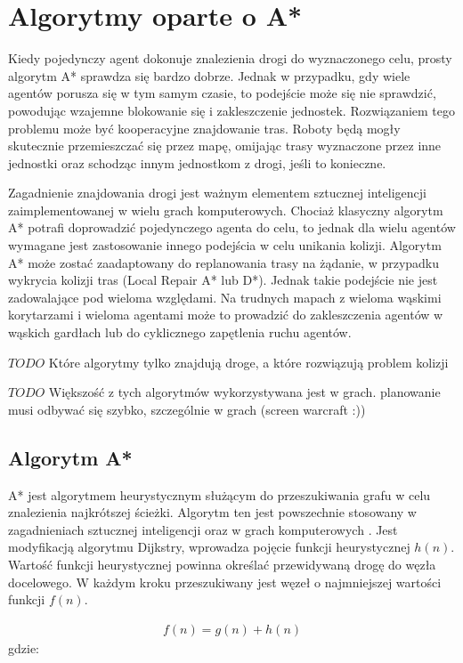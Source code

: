 \chapter{Algorytmy oparte o A*}
\label{ch:astar}

Kiedy pojedynczy agent dokonuje znalezienia drogi do wyznaczonego celu, prosty algorytm A* sprawdza się bardzo dobrze. Jednak w przypadku, gdy wiele agentów porusza się w tym samym czasie, to podejście może się nie sprawdzić, powodując wzajemne blokowanie się i zakleszczenie jednostek. Rozwiązaniem tego problemu może być kooperacyjne znajdowanie tras. Roboty będą mogły skutecznie przemieszczać się przez mapę, omijając trasy wyznaczone przez inne jednostki oraz schodząc innym jednostkom z drogi, jeśli to konieczne. \cite{cooppath}

Zagadnienie znajdowania drogi jest ważnym elementem sztucznej inteligencji zaimplementowanej w wielu grach komputerowych. Chociaż klasyczny algorytm A* potrafi doprowadzić pojedynczego agenta do celu, to jednak dla wielu agentów wymagane jest zastosowanie innego podejścia w celu unikania kolizji. Algorytm A* może zostać zaadaptowany do replanowania trasy na żądanie, w przypadku wykrycia kolizji tras (Local Repair A* lub D*). Jednak takie podejście nie jest zadowalające pod wieloma względami. Na trudnych mapach z wieloma wąskimi korytarzami i wieloma agentami może to prowadzić do zakleszczenia agentów w wąskich gardłach lub do cyklicznego zapętlenia ruchu agentów. \cite{cooppath}

$TODO$ Które algorytmy tylko znajdują droge, a które rozwiązują problem kolizji

$TODO$ Większość z tych algorytmów wykorzystywana jest w grach. planowanie musi odbywać się szybko, szczególnie w grach (screen warcraft :))

\section{Algorytm A*}
A* jest algorytmem heurystycznym służącym do przeszukiwania grafu w celu znalezienia najkrótszej ścieżki. Algorytm ten jest powszechnie stosowany w zagadnieniach sztucznej inteligencji oraz w grach komputerowych \cite{mit_astar}. Jest modyfikacją algorytmu Dijkstry, wprowadza pojęcie funkcji heurystycznej $h(n)$. Wartość funkcji heurystycznej powinna określać przewidywaną drogę do węzła docelowego. W każdym kroku przeszukiwany jest węzeł o najmniejszej wartości funkcji $f(n)$.

\begin{gather}
 	f(n) = g(n) + h(n)
 	\label{eq_astar} 
\end{gather}
 gdzie:

